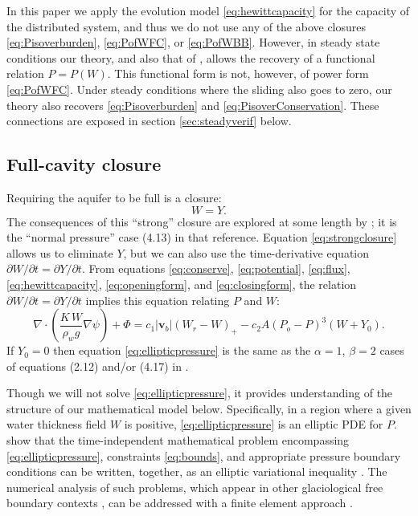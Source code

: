 \documentclass[11pt,final]{amsart}%
\newcommand\bv{\mathbf{v}}
\newcommand{\Div}{\nabla\cdot}
\newcommand{\grad}{\nabla}
\begin{document}
In this paper we apply the evolution model \eqref{eq:hewittcapacity} for the capacity of the distributed system, and thus we do not use any of the above closures \eqref{eq:Pisoverburden}, \eqref{eq:PofWFC}, or \eqref{eq:PofWBB}.  However, in steady state conditions our theory, and also that of \cite{Schoofetal2012}, allows the recovery of a functional relation $P=P(W)$.  This functional form is not, however, of power form \eqref{eq:PofWFC}.  Under steady conditions where the sliding also goes to zero, our theory also recovers \eqref{eq:Pisoverburden} and \eqref{eq:PisoverConservation}.  These connections are exposed in section \ref{sec:steadyverif} below.

\subsection*{Full-cavity closure}  Requiring the aquifer to be full is a closure:
\begin{equation}
W = Y.\label{eq:strongclosure}
\end{equation}
The consequences of this ``strong'' closure are explored at some length by \cite{Schoofetal2012}; it is the ``normal pressure'' case (4.13) in that reference.  Equation \eqref{eq:strongclosure} allows us to eliminate $Y$, but we can also use the time-derivative equation $\partial W/\partial t = \partial Y/\partial t$.  From equations \eqref{eq:conserve}, \eqref{eq:potential}, \eqref{eq:flux}, \eqref{eq:hewittcapacity}, \eqref{eq:openingform}, and \eqref{eq:closingform}, the relation $\partial W/\partial t = \partial Y/\partial t$ implies this equation relating $P$ and $W$:
\begin{equation}
\Div \left(\frac{K\,W}{\rho_w g} \grad \psi \right) + \Phi = c_1 |\bv_b| (W_r - W)_+ - c_2 A (P_o - P)^3 (W+Y_0).\label{eq:ellipticpressure}
\end{equation}
If $Y_0=0$ then equation \eqref{eq:ellipticpressure} is the same as the $\alpha=1$, $\beta=2$ cases of equations (2.12) and/or (4.17) in \citep{Schoofetal2012}.

Though we will not solve \eqref{eq:ellipticpressure}, it provides understanding of the structure of our mathematical model below.  Specifically, in a region where a given water thickness field $W$ is positive, \eqref{eq:ellipticpressure} is an elliptic PDE for $P$.  \cite{Schoofetal2012} show that the time-independent mathematical problem encompassing \eqref{eq:ellipticpressure}, constraints \eqref{eq:bounds}, and appropriate pressure boundary conditions can be written, together, as an elliptic variational inequality \citep{KinderlehrerStampacchia}.  The numerical analysis of such problems, which appear in other glaciological free boundary contexts \citep{SchoofStream,JouvetBueler2012}, can be addressed with a finite element approach \citep{Ciarlet}.
\end{document}
